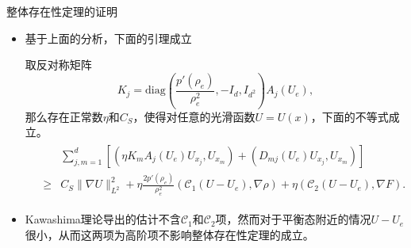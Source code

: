 \documentclass[mathserif]{beamer}
\begin{document}
\begin{frame}{整体存在性定理的证明}
\begin{itemize}
\item<2-> 基于上面的分析，下面的引理成立
\begin{block}{}
取反对称矩阵
$$
K_j = \mbox{diag}\left(\frac{p'(\rho_e)}{\rho_e^2}, -I_d, I_{d^2}\right)A_j(U_e),
$$
那么存在正常数$\eta$和$C_S$，使得对任意的光滑函数$U =U(x)$，下面的不等式成立。
\begin{eqnarray*}%
\begin{smallmatrix}
  &&\sum_{j,m=1}^d [( \eta K_m A_j(U_e) U_{x_j},U_{x_m}) + (D_{mj}(U_e) U_{x_j},U_{x_m})]\nonumber \\
  &\ge& C_S \|\nabla U \|_{L^2}^2 +\eta\frac{2p'(\rho_e)}{\rho_e^2}({\mathcal C}_1(U - U_e), \nabla \rho) + \eta({\mathcal C}_2(U - U_e), \nabla F).
\end{smallmatrix}
\end{eqnarray*}
\end{block}
\item<3-> Kawashima理论导出的估计不含$\mathcal{C}_1$和$\mathcal{C}_2$项，然而对于平衡态附近的情况$U-U_e$很小，从而这两项为高阶项不影响整体存在性定理的成立。
\end{itemize}
\end{frame}



\end{document}
